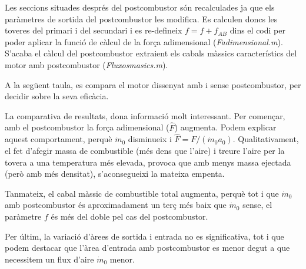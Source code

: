  
\noindent Les seccions situades després del postcombustor són recalculades ja que els paràmetres de sortida del postcombustor les modifica. Es calculen doncs les toveres del primari i del secundari i es re-defineix $f = f +f_{AB}$ dins el codi per poder aplicar la funció de càlcul de la força adimensional (\textit{Fadimensional.m}). S'acaba el càlcul del postcombustor extraient els cabals màssics característics del motor amb postcombustor (\textit{Fluxosmasics.m}).

A la següent taula, es compara el motor dissenyat amb i sense postcombustor, per decidir sobre la seva eficàcia.
\begin{table}[H]
	\centering
	\label{ABres}
	\caption{Resultats d'implementar el postcombustor.}
\end{table}


\noindent La comparativa de resultats, dona informació molt interessant. Per començar, amb el postcombustor la força adimensional ($\hat{F}$)  augmenta. Podem explicar aquest comportament, perquè $ \dot{m}_0$ disminueix i $\hat{F}=F/(\dot{m}_0a_0)$. Qualitativament, el fet d'afegir massa de combustible (més dens que l'aire) i treure l'aire per la tovera a una temperatura més elevada, provoca que amb menys massa ejectada (però amb més densitat), s'aconsegueixi la mateixa empenta.

\noindent Tanmateix, el cabal màssic de combustible total augmenta, perquè tot i que $ \dot{m}_0$ amb postcombustor és aproximadament un terç més baix  que $ \dot{m}_0$ sense, el paràmetre $ f$ és més del doble pel cas del postcombustor.

\noindent Per últim, la variació d'àrees de sortida i entrada no es significativa, tot i que podem destacar que l'àrea d'entrada amb postcombustor es menor degut a que necessitem un flux d'aire $ \dot{m}_0$ menor.

